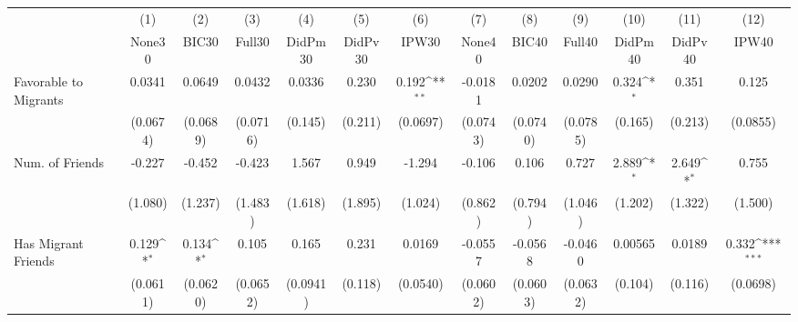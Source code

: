 {
\def\sym#1{\ifmmode^{#1}\else\(^{#1}\)\fi}
\begin{tabular}{l*{12}{c}}
\toprule
            &\multicolumn{1}{c}{(1)}&\multicolumn{1}{c}{(2)}&\multicolumn{1}{c}{(3)}&\multicolumn{1}{c}{(4)}&\multicolumn{1}{c}{(5)}&\multicolumn{1}{c}{(6)}&\multicolumn{1}{c}{(7)}&\multicolumn{1}{c}{(8)}&\multicolumn{1}{c}{(9)}&\multicolumn{1}{c}{(10)}&\multicolumn{1}{c}{(11)}&\multicolumn{1}{c}{(12)}\\
            &\multicolumn{1}{c}{None30}&\multicolumn{1}{c}{BIC30}&\multicolumn{1}{c}{Full30}&\multicolumn{1}{c}{DidPm30}&\multicolumn{1}{c}{DidPv30}&\multicolumn{1}{c}{IPW30}&\multicolumn{1}{c}{None40}&\multicolumn{1}{c}{BIC40}&\multicolumn{1}{c}{Full40}&\multicolumn{1}{c}{DidPm40}&\multicolumn{1}{c}{DidPv40}&\multicolumn{1}{c}{IPW40}\\
\midrule
Favorable to Migrants&      0.0341         &      0.0649         &      0.0432         &      0.0336         &       0.230         &       0.192\sym{**} &     -0.0181         &      0.0202         &      0.0290         &       0.324\sym{*}  &       0.351         &       0.125         \\
            &    (0.0674)         &    (0.0689)         &    (0.0716)         &     (0.145)         &     (0.211)         &    (0.0697)         &    (0.0743)         &    (0.0740)         &    (0.0785)         &     (0.165)         &     (0.213)         &    (0.0855)         \\
\addlinespace
Num. of Friends&      -0.227         &      -0.452         &      -0.423         &       1.567         &       0.949         &      -1.294         &      -0.106         &       0.106         &       0.727         &       2.889\sym{*}  &       2.649\sym{*}  &       0.755         \\
            &     (1.080)         &     (1.237)         &     (1.483)         &     (1.618)         &     (1.895)         &     (1.024)         &     (0.862)         &     (0.794)         &     (1.046)         &     (1.202)         &     (1.322)         &     (1.500)         \\
\addlinespace
Has Migrant Friends&       0.129\sym{*}  &       0.134\sym{*}  &       0.105         &       0.165         &       0.231         &      0.0169         &     -0.0557         &     -0.0568         &     -0.0460         &     0.00565         &      0.0189         &       0.332\sym{***}\\
            &    (0.0611)         &    (0.0620)         &    (0.0652)         &    (0.0941)         &     (0.118)         &    (0.0540)         &    (0.0602)         &    (0.0603)         &    (0.0632)         &     (0.104)         &     (0.116)         &    (0.0698)         \\

\end{tabular}}
